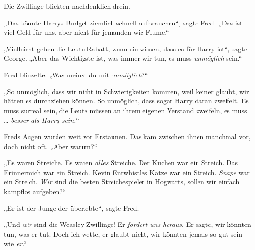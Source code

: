 Die Zwillinge blickten nachdenklich drein.

„Das könnte Harrys Budget ziemlich schnell aufbrauchen“, sagte Fred.
„Das ist viel Geld für uns, aber nicht für jemanden wie Flume.“

„Vielleicht geben die Leute Rabatt, wenn sie wissen, dass es für Harry ist“, sagte George.
„Aber das Wichtigste ist, was immer wir tun, es muss \emph{unmöglich} sein.“

Fred blinzelte.
„Was meinst du mit \emph{unmöglich}?“

„So unmöglich, dass wir nicht in Schwierigkeiten kommen, weil keiner glaubt, wir hätten es durchziehen können. So unmöglich, dass sogar Harry daran zweifelt. Es muss surreal sein, die Leute müssen an ihrem eigenen Verstand zweifeln, es muss … \emph{besser als Harry sein.}“

Freds Augen wurden weit vor Erstaunen. Das kam zwischen ihnen manchmal vor, doch nicht oft.
„Aber warum?“

„Es waren Streiche. Es waren \emph{alles} Streiche. Der Kuchen war ein Streich. Das Erinnermich war ein Streich. Kevin Entwhistles Katze war ein Streich. \emph{Snape} war ein Streich. \emph{Wir} sind die besten Streichespieler in Hogwarts, sollen wir einfach kampflos aufgeben?“

„Er ist der Junge-der-überlebte“, sagte Fred.

„Und \emph{wir} sind die Weasley-Zwillinge! Er \emph{fordert uns} \emph{heraus}. Er sagte, wir könnten tun, was er tut. Doch ich wette, er glaubt nicht, wir könnten jemals so gut sein wie \emph{er}.“

